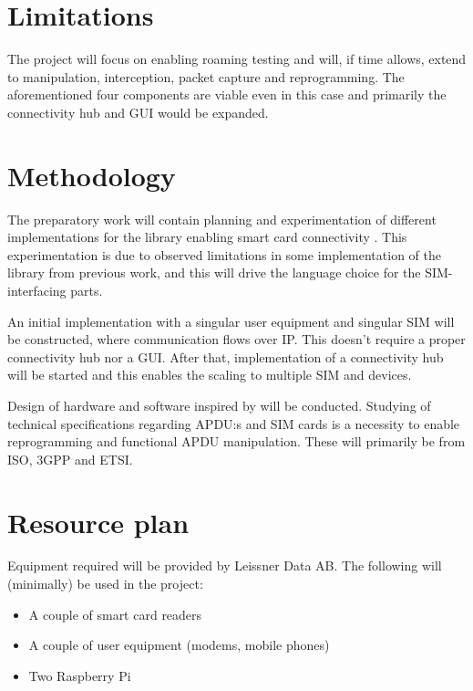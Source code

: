 \documentclass[12pt]{article}
\begin{document}
\section*{Limitations}
The project will focus on enabling roaming testing and will, if
time allows, extend to manipulation, interception, packet capture
and reprogramming. The aforementioned four components are viable
even in this case and primarily the connectivity hub and GUI would
be expanded.

\section*{Methodology}

The preparatory work will contain planning and experimentation of
different implementations for the library enabling smart card
connectivity \cite{pcsc}. This experimentation is due to
observed limitations in some implementation of the library from
previous work, and this will drive the language choice for the
SIM-interfacing parts.

An initial implementation with a singular user equipment and
singular SIM will be constructed, where communication flows over
IP. This doesn't require a proper connectivity hub nor a GUI.
After that, implementation of a connectivity hub will be started
and this enables the scaling to multiple SIM and devices.

Design of hardware and software inspired by \cite{osmocom-remsim}
will be conducted. Studying of technical specifications regarding
APDU:s and SIM cards is a necessity to enable reprogramming and
functional APDU manipulation. These will primarily be from ISO,
3GPP and ETSI.

\section*{Resource plan}
Equipment required will be provided by Leissner Data AB.
The following will (minimally) be used in the project:

\begin{itemize}
    \item A couple of smart card readers
    \item A couple of user equipment (modems, mobile phones)
    \item Two Raspberry Pi
\end{itemize}

\printbibliography[
    heading=bibintoc,
    title={References}
]
\end{document}
